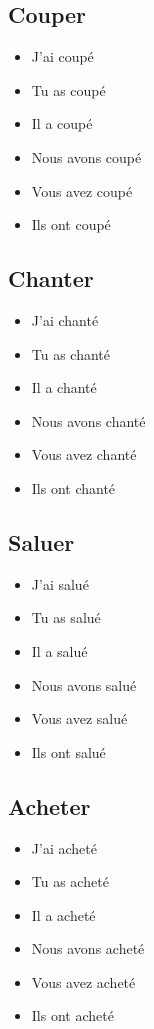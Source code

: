 \subsection{Couper}

\begin{itemize}
    \item J'ai coupé
    \item Tu as coupé 
    \item Il a coupé 
    \item Nous avons coupé 
    \item Vous avez coupé
    \item Ils ont coupé
\end{itemize}

\subsection{Chanter}

\begin{itemize}
    \item J'ai chanté 
    \item Tu as chanté 
    \item Il a chanté 
    \item Nous avons chanté 
    \item Vous avez chanté
    \item Ils ont chanté
\end{itemize}

\subsection{Saluer}

\begin{itemize}
    \item J'ai salué 
    \item Tu as salué 
    \item Il a salué 
    \item Nous avons salué 
    \item Vous avez salué 
    \item Ils ont salué
\end{itemize}

\subsection{Acheter}

\begin{itemize}
    \item J'ai acheté 
    \item Tu as acheté 
    \item Il a acheté
    \item Nous avons acheté 
    \item Vous avez acheté 
    \item Ils ont acheté
\end{itemize}

